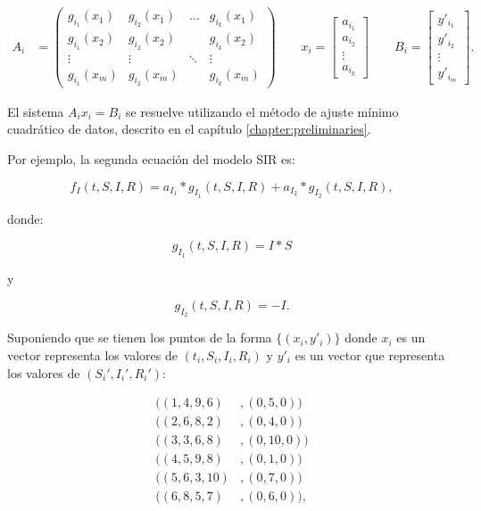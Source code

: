 \begin{align*}
    A_i & = \begin{pmatrix}
        g_{i_1}(x_1) & g_{i_2}(x_1) & \dots  & g_{i_k}(x_1) \\
        g_{i_1}(x_2) & g_{i_2}(x_2) &        & g_{i_k}(x_2) \\
        \vdots       & \vdots       & \ddots & \vdots       \\
        g_{i_1}(x_m) & g_{i_2}(x_m) &        & g_{i_k}(x_m)
    \end{pmatrix}
    \qquad
    x_i = \begin{bmatrix}
        a_{i_1} \\
        a_{i_2} \\
        \vdots  \\
        a_{i_k}
    \end{bmatrix}
    \qquad
    B_i = \begin{bmatrix}
        y'_{i_1} \\
        y'_{i_2} \\
        \vdots   \\
        y'_{i_m}
    \end{bmatrix}.
\end{align*}

El sistema $A_ix_i = B_i$ se resuelve utilizando el método de ajuste mínimo cuadrático de datos, descrito en el capítulo \ref{chapter:preliminaries}.

Por ejemplo, la segunda ecuación del modelo SIR es:

$$f_I (t,S,I,R) = a_{I_1} * g_{I_1}(t,S,I,R) + a_{I_2} * g_{I_2}(t,S,I,R),$$

donde:

$$g_{I_1}(t,S,I,R) = I*S$$

y

$$g_{I_2}(t,S,I,R) = -I.$$

Suponiendo que se tienen los puntos de la forma $\{(x_i, y'_i)\}$ donde $x_i$ es un vector representa los valores de $(t_i, S_i, I_i, R_i)$ y $y'_i$ es un vector que representa los valores de $(S_i', I_i', R_i')$:

\begin{align*}
    ((1, 4, 9, 6)  & ,  (0, 5, 0))  \\
    ((2, 6, 8, 2)  & ,  (0, 4, 0))  \\
    ((3, 3, 6, 8)  & ,  (0, 10, 0)) \\
    ((4, 5, 9, 8)  & ,  (0, 1, 0))  \\
    ((5, 6, 3, 10) & , (0, 7, 0))   \\
    ((6, 8, 5, 7)  & ,  (0, 6, 0)), \\
\end{align*}

